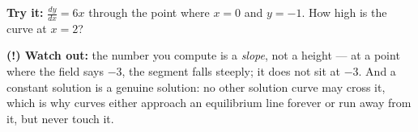 \documentclass[12pt]{article}
\begin{document}
\begin{tryitbox}
\textbf{Try it:} $\frac{dy}{dx} = 6x$ through the point where $x = 0$ and
$y = -1$. How high is the curve at $x = 2$?\\[2pt]
\end{tryitbox}

\begin{watchoutbox}
\textbf{(!) Watch out:} the number you compute is a \emph{slope}, not a height
--- at a point where the field says $-3$, the segment falls steeply; it does
not sit at $-3$. And a constant solution is a genuine solution: no other
solution curve may cross it, which is why curves either approach an equilibrium
line forever or run away from it, but never touch it.
\end{watchoutbox}
\end{document}
